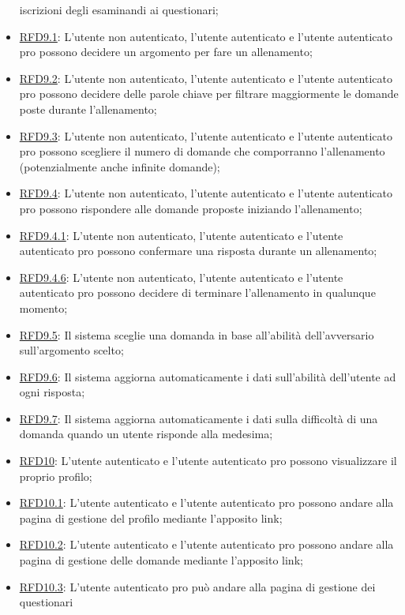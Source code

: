 \begin{itemize}
iscrizioni degli esaminandi ai questionari;
\item \hyperlink{RFD9.1}{RFD9.1}: L’utente non autenticato, l’utente
autenticato e l’utente autenticato pro
possono decidere un argomento per fare
un allenamento;
\item \hyperlink{RFD9.2}{RFD9.2}: L’utente non autenticato, l’utente
autenticato e l’utente autenticato pro
possono decidere delle parole chiave per
filtrare maggiormente le domande poste
durante l’allenamento;
\item \hyperlink{RFD9.3}{RFD9.3}: L’utente non autenticato, l’utente
autenticato e l’utente autenticato pro
possono scegliere il numero di domande
che comporranno l’allenamento
(potenzialmente anche infinite domande);
\item \hyperlink{RFD9.4}{RFD9.4}: L’utente non autenticato, l’utente
autenticato e l’utente autenticato pro
possono rispondere alle domande
proposte iniziando l’allenamento;
\item \hyperlink{RFD9.4.1}{RFD9.4.1}: L’utente non autenticato, l’utente
autenticato e l’utente autenticato pro
possono confermare una risposta durante
un allenamento;
\item \hyperlink{RFD9.4.6}{RFD9.4.6}: L’utente non autenticato, l’utente
autenticato e l’utente autenticato pro
possono decidere di terminare
l’allenamento in qualunque momento;
\item \hyperlink{RFD9.5}{RFD9.5}: Il sistema sceglie una domanda in base
all’abilità dell’avversario sull’argomento
scelto;
\item \hyperlink{RFD9.6}{RFD9.6}: Il sistema aggiorna automaticamente i
dati sull’abilità dell’utente ad ogni
risposta;
\item \hyperlink{RFD9.7}{RFD9.7}: Il sistema aggiorna automaticamente i
dati sulla difficoltà di una domanda
quando un utente risponde alla medesima;
\item \hyperlink{RFD10}{RFD10}: L’utente autenticato e l’utente
autenticato pro possono visualizzare il
proprio profilo;
\item \hyperlink{RFD10.1}{RFD10.1}: L’utente autenticato e l’utente
autenticato pro possono andare alla
pagina di gestione del profilo mediante
l’apposito link;
\item \hyperlink{RFD10.2}{RFD10.2}: L’utente autenticato e l’utente
autenticato pro possono andare alla
pagina di gestione delle domande
mediante l’apposito link;
\item \hyperlink{RFD10.3}{RFD10.3}: L’utente autenticato pro può andare alla
pagina di gestione dei questionari

\end{itemize}
